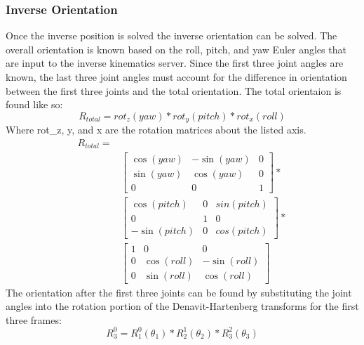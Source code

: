 \documentclass{article}
\begin{document}
\subsubsection{Inverse Orientation}
Once the inverse position is solved the inverse orientation can be solved. The overall orientation is known based on the roll, pitch, and yaw Euler angles that are input to the inverse kinematics server. Since the first three joint angles are known, the last three joint angles must account for the difference in orientation between the first three joints and the total orientation.
The total orientaion is found like so:
\[R_{total} = rot_z(yaw) * rot_y(pitch) * rot_x(roll)\]
Where rot\_z, y, and x are the rotation matrices about the listed axis.
\[
\begin{split} R_{total} = \\
& \begin{bmatrix}
    \cos(yaw) & -\sin(yaw) & 0 \\
    \sin(yaw) & \cos(yaw) & 0 \\
    0 & 0 & 1
\end{bmatrix}
* \\
& \begin{bmatrix}
    \cos(pitch) & 0 & sin(pitch) \\
    0 & 1 & 0 \\
    -\sin(pitch) & 0 & cos(pitch)
\end{bmatrix}
* \\
& \begin{bmatrix}
    1 & 0 & 0 \\
    0 & \cos(roll) & -\sin(roll) \\
    0 & \sin(roll) & \cos(roll)
\end{bmatrix}
\end{split}
\]
The orientation after the first three joints can be found by substituting the joint angles into the rotation portion of the Denavit-Hartenberg transforms for the first three frames:
\[R^0_3 = R^0_1(\theta_1) * R^1_2(\theta_2) * R^2_3(\theta_3)\]
\end{document}
